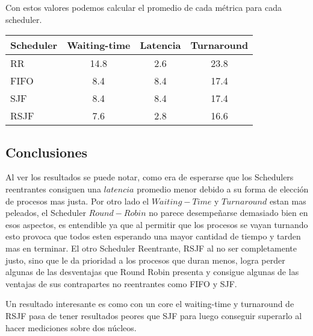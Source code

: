 Con estos valores podemos calcular el promedio de cada métrica para cada scheduler.

\begin{center}
        \begin{tabular}{| l | c | c | c |}
                \hline
    Scheduler & Waiting-time & Latencia & Turnaround \\
                \hline
    RR   &    14.8 &  2.6 & 23.8 \\
    FIFO &     8.4 &  8.4 & 17.4 \\
    SJF  &     8.4 &  8.4 & 17.4 \\
    RSJF &     7.6 &  2.8 & 16.6 \\
                \hline
        \end{tabular}
\end{center}

\subsection{Conclusiones}

Al ver los resultados se puede notar, como era de esperarse que los Schedulers reentrantes consiguen una $latencia$ promedio menor debido a su forma de elección de procesos mas justa. Por otro lado el $Waiting-Time$ y $Turnaround$ estan mas peleados, el Scheduler $Round-Robin$ no parece desempeñarse demasiado bien en esos aspectos, es entendible ya que al permitir que los procesos se vayan turnando esto provoca que todos esten esperando una mayor cantidad de tiempo y tarden mas en terminar. El otro Scheduler Reentrante, RSJF al no ser completamente justo, sino que le da prioridad a los procesos que duran menos, logra perder algunas de las desventajas que Round Robin presenta y consigue algunas de las ventajas de sus contrapartes no reentrantes como FIFO y SJF.

Un resultado interesante es como con un core el waiting-time y turnaround de RSJF pasa de tener resultados peores que SJF para luego conseguir superarlo al hacer mediciones sobre dos núcleos.